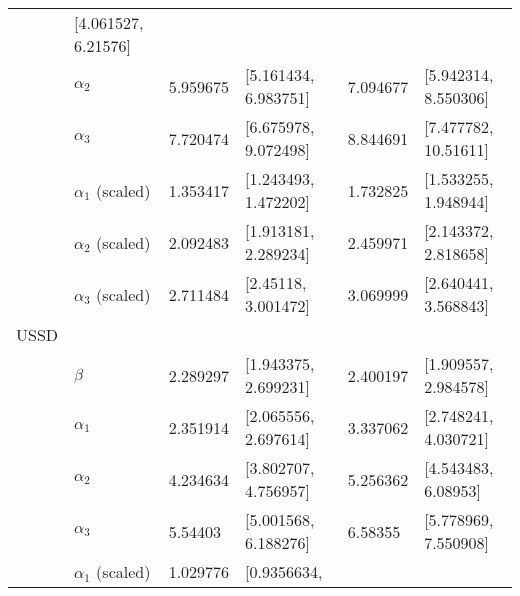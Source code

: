\documentclass[12pt,letterpaper,leqno]{article}\usepackage[]{graphicx}\usepackage[]{color}
\begin{document}
\begin{table}[!h]
\begin{tabular}{p{.5cm}p{2cm}p{1.5cm}p{4cm}p{1.5cm}p{4cm}}
                         & [4.061527, 
                         6.21576]\\
 & $\alpha_{2}$          & 5.959675 
                         & [5.161434, 
                         6.983751]
                         & 7.094677 
                         & [5.942314, 
                         8.550306]\\
 & $\alpha_{3}$          & 7.720474 
                         & [6.675978, 
                         9.072498]
                         & 8.844691 
                         & [7.477782, 
                         10.51611]\\
 & $\alpha_{1}$ (scaled) & 1.353417 
                         & [1.243493, 
                         1.472202]
                         & 1.732825 
                         & [1.533255, 
                         1.948944]\\
 & $\alpha_{2}$ (scaled) & 2.092483 
                         & [1.913181, 
                         2.289234]
                         & 2.459971 
                         & [2.143372, 
                         2.818658]\\
 & $\alpha_{3}$ (scaled) & 2.711484 
                         & [2.45118, 
                         3.001472]
                         & 3.069999 
                         & [2.640441, 
                         3.568843]\\
USSD & & & & & \\ 
 & $\beta$               & 2.289297 
                         & [1.943375, 
                         2.699231] 
                         & 2.400197 
                         & [1.909557, 
                         2.984578]\\
 & $\alpha_{1}$          & 2.351914 
                         & [2.065556, 
                         2.697614]
                         & 3.337062 
                         & [2.748241, 
                         4.030721]\\
 & $\alpha_{2}$          & 4.234634 
                         & [3.802707, 
                         4.756957]
                         & 5.256362 
                         & [4.543483, 
                         6.08953]\\
 & $\alpha_{3}$          & 5.54403 
                         & [5.001568, 
                         6.188276]
                         & 6.58355 
                         & [5.778969, 
                         7.550908]\\
 & $\alpha_{1}$ (scaled) & 1.029776 
                         & [0.9356634, 

\end{tabular}
\end{table}
\end{document}
